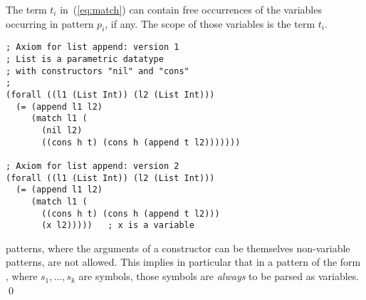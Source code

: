 
The term $t_i$ in~(\ref{eq:match}) can contain free occurrences 
of the variables occurring in pattern $p_i$, if any.
The scope of those variables is the term $t_i$.

\begin{lstlisting}[linewidth=29em]
; Axiom for list append: version 1
; List is a parametric datatype 
; with constructors "nil" and "cons"
;
(forall ((l1 (List Int)) (l2 (List Int)))
  (= (append l1 l2)
     (match l1 (
       (nil l2)
       ((cons h t) (cons h (append t l2)))))))

; Axiom for list append: version 2
(forall ((l1 (List Int)) (l2 (List Int)))
  (= (append l1 l2)
     (match l1 (
       ((cons h t) (cons h (append t l2)))
       (x l2)))))   ; x is a variable
\end{lstlisting}

\begin{remark}
 patterns, where the arguments of a constructor can be themselves
non-variable patterns, are not allowed.
This implies in particular that in a pattern of the form ,
where $s_1, \ldots, s_k$ are symbols, those symbols are \emph{always} to be parsed as variables.
\qed
\end{remark}

